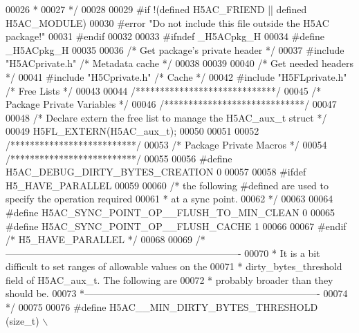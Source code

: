 \begin{DoxyCode}
00026 \textcolor{comment}{ *}
00027 \textcolor{comment}{ */}
00028 
00029 \textcolor{preprocessor}{#if !(defined H5AC\_FRIEND || defined H5AC\_MODULE)}
00030 \textcolor{preprocessor}{#error "Do not include this file outside the H5AC package!"}
00031 \textcolor{preprocessor}{#endif}
00032 
00033 \textcolor{preprocessor}{#ifndef \_H5ACpkg\_H}
00034 \textcolor{preprocessor}{#define \_H5ACpkg\_H}
00035 
00036 \textcolor{comment}{/* Get package's private header */}
00037 \textcolor{preprocessor}{#include "H5ACprivate.h"}    \textcolor{comment}{/* Metadata cache           */}
00038 
00039 
00040 \textcolor{comment}{/* Get needed headers */}
00041 \textcolor{preprocessor}{#include "H5Cprivate.h"}         \textcolor{comment}{/* Cache                                */}
00042 \textcolor{preprocessor}{#include "H5FLprivate.h"}        \textcolor{comment}{/* Free Lists                           */}
00043 
00044 \textcolor{comment}{/*****************************/}
00045 \textcolor{comment}{/* Package Private Variables */}
00046 \textcolor{comment}{/*****************************/}
00047 
00048 \textcolor{comment}{/* Declare extern the free list to manage the H5AC\_aux\_t struct */}
00049 H5FL\_EXTERN(H5AC\_aux\_t);
00050 
00051 
00052 \textcolor{comment}{/**************************/}
00053 \textcolor{comment}{/* Package Private Macros */}
00054 \textcolor{comment}{/**************************/}
00055 
00056 \textcolor{preprocessor}{#define H5AC\_DEBUG\_DIRTY\_BYTES\_CREATION 0}
00057 
00058 \textcolor{preprocessor}{#ifdef H5\_HAVE\_PARALLEL}
00059 
00060 \textcolor{comment}{/* the following #defined are used to specify the operation required}
00061 \textcolor{comment}{ * at a sync point.}
00062 \textcolor{comment}{ */}
00063 
00064 \textcolor{preprocessor}{#define H5AC\_SYNC\_POINT\_OP\_\_FLUSH\_TO\_MIN\_CLEAN      0}
00065 \textcolor{preprocessor}{#define H5AC\_SYNC\_POINT\_OP\_\_FLUSH\_CACHE         1}
00066 
00067 \textcolor{preprocessor}{#endif }\textcolor{comment}{/* H5\_HAVE\_PARALLEL */}\textcolor{preprocessor}{}
00068 
00069 \textcolor{comment}{/*-------------------------------------------------------------------------}
00070 \textcolor{comment}{ *  It is a bit difficult to set ranges of allowable values on the}
00071 \textcolor{comment}{ *  dirty\_bytes\_threshold field of H5AC\_aux\_t.  The following are}
00072 \textcolor{comment}{ *  probably broader than they should be.}
00073 \textcolor{comment}{ *-------------------------------------------------------------------------}
00074 \textcolor{comment}{ */}
00075 
00076 \textcolor{preprocessor}{#define H5AC\_\_MIN\_DIRTY\_BYTES\_THRESHOLD     (size\_t) \(\backslash\)}

\end{DoxyCode}
